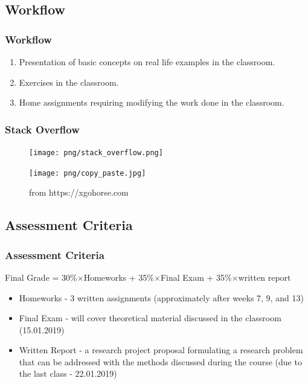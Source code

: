 \subsection[Workflow]{Workflow}
\begin{frame}
    \frametitle{Workflow}
    \begin{enumerate}
            \item Presentation of basic concepts on real life examples in the classroom.
            \item Exercises in the classroom.
            \item Home assignments requiring modifying the work done in the classroom.
        \end{enumerate}
    \end{frame}

\begin{frame}
    \frametitle{Stack Overflow}
    \begin{overprint}
            \begin{figure}
                \centering
                \texttt{[image: png/stack\_overflow.png]}
            \end{figure}
            \begin{figure}
                \centering
                \texttt{[image: png/copy\_paste.jpg]}
                \caption{from https://xgohorse.com}
            \end{figure}
    \end{overprint}
\end{frame}

\subsection[Assessment]{Assessment Criteria}
\begin{frame}
    \frametitle{Assessment Criteria}
    \begin{block}{}
        Final Grade = 30\%$\times$Homeworks + 35\%$\times$Final Exam + 35\%$\times$written report\\
    \end{block}
        \begin{itemize}
        \item Homeworks - 3 written assignments (approximately after weeks 7, 9, and 13)
        \item Final Exam - will cover theoretical material discussed in the classroom (15.01.2019)
        \item Written Report - a research project proposal formulating a research problem that can be addressed with the methods discussed during the course (due to the last class - 22.01.2019)
    \end{itemize}
\end{frame}

